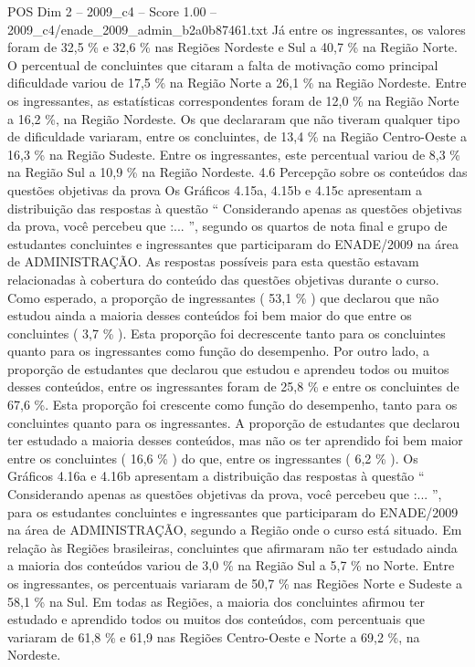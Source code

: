\begin{textsample}{POS Dim 2 – 2009\_c4 – Score 1.00 – 2009\_c4/enade\_2009\_admin\_b2a0b87461.txt}
Já entre os ingressantes, os valores foram de 32,5 \% e 32,6 \% nas Regiões Nordeste e Sul a 40,7 \% na Região Norte.
O percentual de concluintes que citaram a falta de motivação como principal dificuldade variou de 17,5 \% na Região Norte a 26,1 \% na Região Nordeste.
Entre os ingressantes, as estatísticas correspondentes foram de 12,0 \% na Região Norte a 16,2 \%, na Região Nordeste.
Os que declararam que não tiveram qualquer tipo de dificuldade variaram, entre os concluintes, de 13,4 \% na Região Centro-Oeste a 16,3 \% na Região Sudeste.
Entre os ingressantes, este percentual variou de 8,3 \% na Região Sul a 10,9 \% na Região Nordeste. 4.6 Percepção sobre os conteúdos das questões objetivas da prova Os Gráficos 4.15a, 4.15b e 4.15c apresentam a distribuição das respostas à questão “ Considerando apenas as questões objetivas da prova, você percebeu que :... ”, segundo os quartos de nota final e grupo de estudantes concluintes e ingressantes que participaram do ENADE/2009 na área de ADMINISTRAÇÃO.
As respostas possíveis para esta questão estavam relacionadas à cobertura do conteúdo das questões objetivas durante o curso.
Como esperado, a proporção de ingressantes ( 53,1 \% ) que declarou que não estudou ainda a maioria desses conteúdos foi bem maior do que entre os concluintes ( 3,7 \% ).
Esta proporção foi decrescente tanto para os concluintes quanto para os ingressantes como função do desempenho.
Por outro lado, a proporção de estudantes que declarou que estudou e aprendeu todos ou muitos desses conteúdos, entre os ingressantes foram de 25,8 \% e entre os concluintes de 67,6 \%.
Esta proporção foi crescente como função do desempenho, tanto para os concluintes quanto para os ingressantes.
A proporção de estudantes que declarou ter estudado a maioria desses conteúdos, mas não os ter aprendido foi bem maior entre os concluintes ( 16,6 \% ) do que, entre os ingressantes ( 6,2 \% ).
Os Gráficos 4.16a e 4.16b apresentam a distribuição das respostas à questão “ Considerando apenas as questões objetivas da prova, você percebeu que :... ”, para os estudantes concluintes e ingressantes que participaram do ENADE/2009 na área de ADMINISTRAÇÃO, segundo a Região onde o curso está situado.
Em relação às Regiões brasileiras, concluintes que afirmaram não ter estudado ainda a maioria dos conteúdos variou de 3,0 \% na Região Sul a 5,7 \% no Norte.
Entre os ingressantes, os percentuais variaram de 50,7 \% nas Regiões Norte e Sudeste a 58,1 \% na Sul.
Em todas as Regiões, a maioria dos concluintes afirmou ter estudado e aprendido todos ou muitos dos conteúdos, com percentuais que variaram de 61,8 \% e 61,9 nas Regiões Centro-Oeste e Norte a 69,2 \%, na Nordeste.

\end{textsample}
